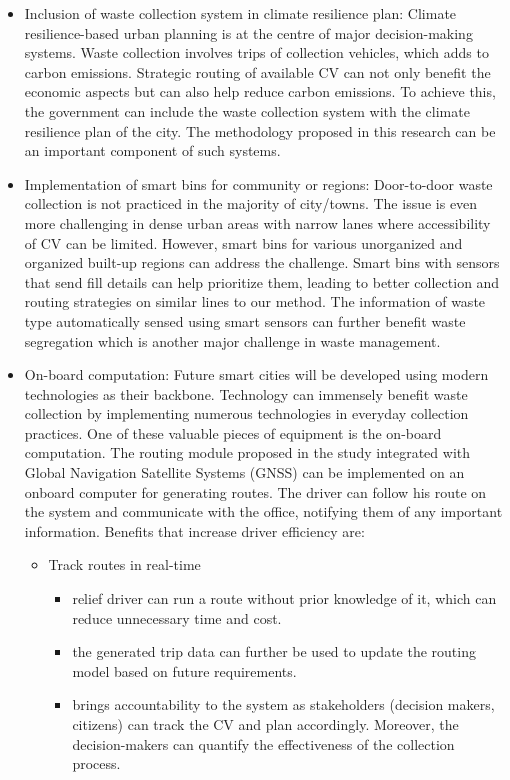 \documentclass[12pt]{article}
\begin{document}
\begin{itemize}
\item Inclusion of waste collection system in climate resilience plan: Climate resilience-based urban planning is at the centre of major decision-making systems. Waste collection involves trips of collection vehicles, which adds to carbon emissions. Strategic routing of available CV can not only benefit the economic aspects but can also help reduce carbon emissions. To achieve this, the government can include the waste collection system with the climate resilience plan of the city. The methodology proposed in this research can be an important component of such systems.
    
\item Implementation of smart bins for community or regions:  Door-to-door waste collection is not practiced in the majority of city/towns. The issue is even more challenging in dense urban areas with narrow lanes where accessibility of CV can be limited. However, smart bins for various unorganized and organized built-up regions can address the challenge. Smart bins with sensors that send fill details can help prioritize them, leading to better collection and routing strategies on similar lines to our method. The information of waste type automatically sensed using smart sensors can further benefit waste segregation which is another major challenge in waste management.\cite{actionplan}

 \item On-board computation: Future smart cities will be developed using modern technologies as their backbone. Technology can immensely benefit waste collection by implementing numerous technologies in everyday collection practices. One of these valuable pieces of equipment is the on-board computation. The routing module proposed in the study integrated with Global Navigation Satellite Systems (GNSS) can be implemented on an onboard computer for generating routes. The driver can follow his route on the system and communicate with the office, notifying them of any important information. Benefits that increase driver efficiency are:
 \begin{itemize}
 \item Track routes in real-time
   \begin{itemize}
 \item relief driver can run a route without prior knowledge of it, which can reduce unnecessary time and cost.\item the generated trip data can further be used to update the routing model based on future requirements.
   \item brings accountability to the system as stakeholders (decision makers, citizens) can track the CV and plan accordingly. Moreover, the decision-makers can quantify the effectiveness of the collection process. 
    

\end{itemize}
\end{itemize}
\end{itemize}
\end{document}
